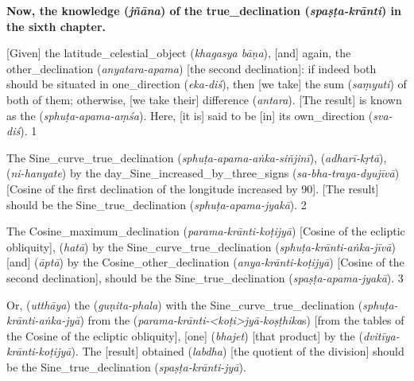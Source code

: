 \textbf{Now, the \gls{knowledge} (\textit{jñāna}) of the \gls{true_declination} (\textit{spaṣṭa-krānti}) in the sixth chapter.}\medskip

[Given] the \gls{latitude_celestial_object} (\textit{khagasya bāṇa}), [and] again, the \gls{other_declination} (\textit{anyatara-apama}) [\ie the second declination]: if indeed both should be situated in \gls{one_direction} (\textit{eka-diś}), then [we take] the \gls{sum} (\textit{saṃyuti}) of both of them; otherwise, [we take their] \gls{difference} (\textit{antara}). [The result] is known as the  (\textit{sphuṭa-apama-aṃśa}). Here, [it is] said to be [in] its \gls{own_direction} (\textit{sva-diś}). 1  

The \gls{Sine_curve_true_declination} (\textit{sphuṭa-apama-aṅka-siñjinī}),  (\textit{adharī-kṛtā}),  (\textit{ni-hanyate}) by the \gls{day_Sine_increased_by_three_signs} (\textit{sa-bha-traya-dyujīvā}) [\ie Cosine of the first declination of the longitude increased by 90\degree]. [The result] should be the \gls{Sine_true_declination} (\textit{sphuṭa-apama-jyakā}). 2 
\bigskip

The \gls{Cosine_maximum_declination} (\textit{parama-krānti-koṭijyā}) [\ie Cosine of the ecliptic obliquity],  (\textit{hatā}) by the \gls{Sine_curve_true_declination} (\textit{sphuṭa-krānti-aṅka-jīvā}) [and]  (\textit{āptā}) by the \gls{Cosine_other_declination} (\textit{anya-krānti-koṭijyā}) [\ie Cosine of the second declination], should be the \gls{Sine_true_declination} (\textit{spaṣṭa-apama-jyakā}). 3  


Or,  (\textit{utthāya}) the  (\textit{guṇita-phala}) with the \gls{Sine_curve_true_declination} (\textit{sphuṭa-krānti-aṅka-jyā}) from the  (\textit{parama-krānti-<koṭi>jyā-koṣṭhika}s) [\ie from the tables of the Cosine of the ecliptic obliquity], [one]  (\textit{bhajet}) [that product] by the  (\textit{dvitīya-krānti-koṭijyā}). The [result] \gls{obtained} (\textit{labdha}) [\ie the quotient of the division] should be the \gls{Sine_true_declination} (\textit{spaṣṭa-krānti-jyā}).  

